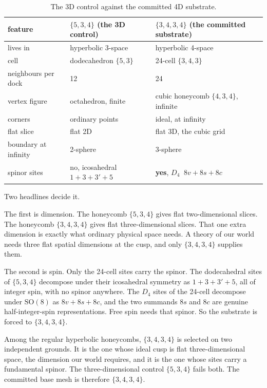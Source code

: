 \begin{table}[ht]
\centering
\begin{tabular}{@{}lll@{}}
\toprule
feature & $\{5,3,4\}$ (the 3D control) & $\{3,4,3,4\}$ (the committed substrate) \\
\midrule
lives in & hyperbolic 3-space & hyperbolic 4-space \\
cell & dodecahedron $\{5,3\}$ & 24-cell $\{3,4,3\}$ \\
neighbours per dock & 12 & 24 \\
vertex figure & octahedron, finite & cubic honeycomb $\{4,3,4\}$, infinite \\
corners & ordinary points & ideal, at infinity \\
flat slice & flat 2D & flat 3D, the cubic grid \\
boundary at infinity & 2-sphere & 3-sphere \\
spinor sites & no, icosahedral $1 + 3 + 3' + 5$ & \textbf{yes}, $D_4$ $\ 8v + 8s + 8c$ \\
\bottomrule
\end{tabular}
\caption{The 3D control against the committed 4D substrate.}
\label{tab:534-vs-3434}
\end{table}

Two headlines decide it.

The first is dimension. The honeycomb $\{5,3,4\}$ gives flat two-dimensional slices. The honeycomb $\{3,4,3,4\}$ gives flat three-dimensional slices. That one extra dimension is exactly what ordinary physical space needs. A theory of our world needs three flat spatial dimensions at the cusp, and only $\{3,4,3,4\}$ supplies them.

The second is spin. Only the 24-cell sites carry the spinor. The dodecahedral sites of $\{5,3,4\}$ decompose under their icosahedral symmetry as $1 + 3 + 3' + 5$, all of integer spin, with no spinor anywhere. The $D_4$ sites of the 24-cell decompose under $\mathrm{SO}(8)$ as $8v + 8s + 8c$, and the two summands $8s$ and $8c$ are genuine half-integer-spin representations. Free spin needs that spinor. So the substrate is forced to $\{3,4,3,4\}$.

\begin{result}
Among the regular hyperbolic honeycombs, $\{3,4,3,4\}$ is selected on two independent grounds. It is the one whose ideal cusp is flat three-dimensional space, the dimension our world requires, and it is the one whose sites carry a fundamental spinor. The three-dimensional control $\{5,3,4\}$ fails both. The committed base mesh is therefore $\{3,4,3,4\}$.
\end{result}

